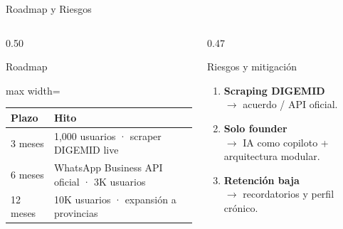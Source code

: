 \documentclass[aspectratio=169,11pt]{beamer}
\newcommand{\tightlist}{\setlength\itemsep{2pt}\setlength\parskip{0pt}\setlength\parsep{0pt}}
\begin{document}
\begin{frame}[t]{Roadmap y Riesgos}
\vspace{-0.3em}
\begin{columns}[T,onlytextwidth]
\begin{column}{0.50\textwidth}
\begin{block}{Roadmap}
\begin{adjustbox}{max width=\linewidth}
\begin{tabular}{ll}
\toprule
\textbf{Plazo} & \textbf{Hito} \\
\midrule
3 meses  & 1,000 usuarios · scraper DIGEMID live \\
6 meses  & WhatsApp Business API oficial · 3K usuarios \\
12 meses & 10K usuarios · expansión a provincias \\
\bottomrule
\end{tabular}
\end{adjustbox}
\end{block}
\end{column}
\begin{column}{0.47\textwidth}
\begin{block}{Riesgos y mitigación}
\begin{enumerate}\tightlist
  \item \textbf{Scraping DIGEMID}\\
        {\color{Muted}\scriptsize $\rightarrow$ acuerdo / API oficial.}
  \item \textbf{Solo founder}\\
        {\color{Muted}\scriptsize $\rightarrow$ IA como copiloto + arquitectura modular.}
  \item \textbf{Retención baja}\\
        {\color{Muted}\scriptsize $\rightarrow$ recordatorios y perfil crónico.}
\end{enumerate}
\end{block}
\end{column}
\end{columns}
\end{frame}
\end{document}
